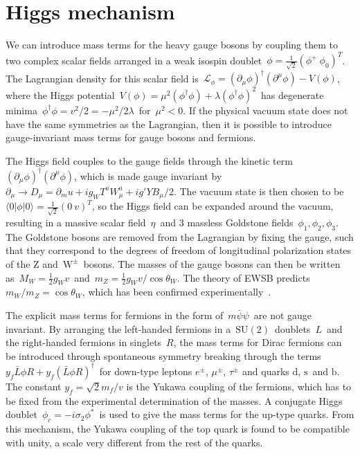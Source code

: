 \section{Higgs mechanism}
We can introduce mass terms for the heavy gauge bosons by coupling them to two complex scalar fields arranged in a weak isospin doublet~$\phi = \frac{1}{\sqrt{2}} (\phi^+\ \phi_0)^T$. The Lagrangian density for this scalar field is~$\mathcal{L}_{\phi} = (\partial_\mu \phi)^\dagger (\partial^\mu \phi) - V(\phi)$, where the Higgs potential~$V(\phi) = \mu^2 (\phi^\dagger \phi) + \lambda (\phi^\dagger \phi)^2$~has degenerate minima~$\phi^\dagger \phi = v^2 / 2 = -\mu^2/2\lambda$~for~$\mu^2 < 0$. If the physical vacuum state does not have the same symmetries as the Lagrangian, then it is possible to introduce gauge-invariant mass terms for gauge bosons and fermions.

The Higgs field couples to the gauge fields through the kinetic term~$(\partial_{\mu} \phi)^\dagger (\partial^\mu \phi)$, which is made gauge invariant by~$\partial_\mu \rightarrow D_\mu = \partial_mu + i g_W T^a W_\mu^a + i g' Y B_\mu / 2$. The vacuum state is then chosen to be~$\langle 0|\phi|0\rangle = \frac{1}{\sqrt{2}} (0\ v)^T$, so the Higgs field can be expanded around the vacuum, resulting in a massive scalar field~$\eta$~and 3 massless Goldstone fields~$\phi_1, \phi_2, \phi_3$. The Goldstone bosons are removed from the Lagrangian by fixing the gauge, such that they correspond to the degrees of freedom of longitudinal polarization states of the Z and~$\mathrm{W}^\pm$~bosons. The masses of the gauge bosons can then be written as~$M_W = \frac{1}{2} g_W v$~and~$m_Z = \frac{1}{2} g_W v / \cos{\theta_W}$. The theory of EWSB predicts~$m_W / m_Z = \cos{\theta_W}$, which has been confirmed experimentally~\cite{ALEPH:2005ab}.

The explicit mass terms for fermions in the form of~$m \bar{\psi} \psi$~are not gauge invariant. By arranging the left-handed fermions in a~$\mathrm{SU}(2)$~doublets~$L$~and the right-handed fermions in singlets~$R$, the mass terms for Dirac fermions can be introduced through spontaneous symmetry breaking through the terms~$y_f \bar{L}\phi R + y_f (\bar{L}\phi R)^\dagger$~for down-type leptons $e^\pm$, $\mu^\pm$, $\tau^\pm$ and quarks $\mathrm{d}$, $\mathrm{s}$~and $\mathrm{b}$. The constant $y_f = \sqrt{2} m_f / v$ is the Yukawa coupling of the fermions, which has to be fixed from the experimental determination of the masses. A conjugate Higgs doublet~$\phi_c = -i\sigma_2 \phi^*$~is used to give the mass terms for the up-type quarks. From this mechanism, the Yukawa coupling of the top quark is found to be compatible with unity, a scale very different from the rest of the quarks.

